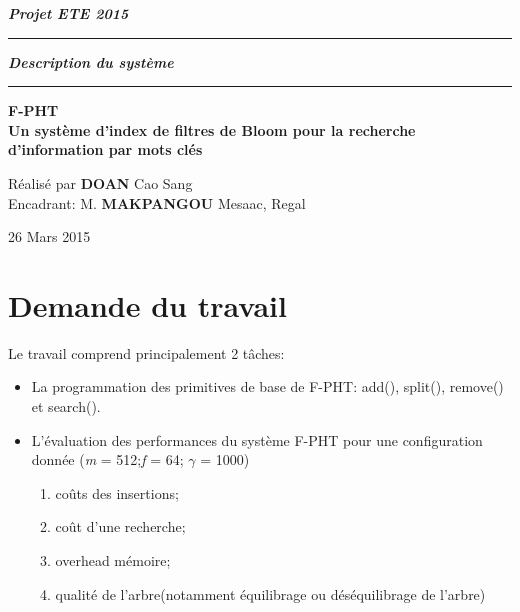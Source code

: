 \documentclass[a4paper,11pt]{report}
\begin{document}
	\begin{titlepage}
		\begin{center}
			\large\bfseries\itshape Projet ETE 2015\\
		\end{center}
		\noindent\rule{\linewidth}{3pt}

		\begin{center}
			\Huge\bfseries\itshape Description du système\\
		\end{center}
		
		\noindent\rule{\linewidth}{3pt}
		\begin{center}
			\bfseries
			\large F-PHT \\
			\large Un système d'index de filtres de Bloom pour la recherche d'information par mots clés
		\end{center}
		\begin{center}
			Réalisé par \textbf{DOAN} Cao Sang \\
			Encadrant: M. \textbf{MAKPANGOU} Mesaac, Regal
		\end{center}
		\begin{center}
			26 Mars 2015
		\end{center}
	\end{titlepage}

\tableofcontents

\chapter{Demande du travail}
Le travail comprend principalement 2 tâches:
\begin{itemize}
	\item La programmation des primitives de base de F-PHT: add(), split(), remove() et search().
	\item L'évaluation des performances du système F-PHT pour une configuration donnée (\textit{m} = 512;\textit{f} = 64; $\gamma$ = 1000)
			\begin{enumerate}
				\item coûts des insertions;
				\item coût d'une recherche;
				\item overhead mémoire;
				\item qualité de l'arbre(notamment équilibrage ou déséquilibrage de l'arbre)
			\end{enumerate}
\end{itemize}
\end{document}
